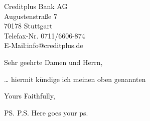 \documentclass{letter}
\begin{document}
\begin{letter}{Creditplus Bank AG \\ Augustenstra\ss e 7 \\ 70178 Stuttgart \\ Telefax-Nr. 0711/6606-874\\E-Mail:info@creditplus.de\\}
\opening{Sehr geehrte Damen und Herrn,}
\dots
hiermit k\"undige ich meinen oben genannten 
\closing{Yours Faithfully,}
\ps{P.S. Here goes your ps.}
\end{letter}
\end{document}
